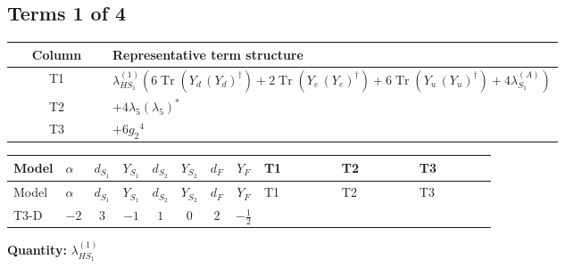 \documentclass[8pt]{article}
\begin{document}
\begin{landscape}
\subsection*{Terms 1 of 4}
\begin{center}
\begin{tabular}{@{}c >{\raggedright\arraybackslash}p{0.82\linewidth}@{}}
\toprule
Column & Representative term structure \\
\midrule
T1 & \(\displaystyle {\lambda_{HS_1}^{(1)}} (6 \operatorname{Tr}\!\left({Y_d}\,\left({Y_d}\right)^{\dagger}\right)+2 \operatorname{Tr}\!\left({Y_e}\,\left({Y_e}\right)^{\dagger}\right)+6 \operatorname{Tr}\!\left({Y_u}\,\left({Y_u}\right)^{\dagger}\right)+4 {\lambda_{S_1}^{(A)}})\) \\
\midrule
T2 & \(\displaystyle +4 {\lambda_5} \left({\lambda_5}\right)^{*}\) \\
\midrule
T3 & \(\displaystyle +6 {g_2}^4\) \\
\midrule
\bottomrule
\end{tabular}
\end{center}
\smallskip
\tiny
\begin{longtable}{@{}llcccccc >{\raggedright\arraybackslash}p{0.21\linewidth} >{\raggedright\arraybackslash}p{0.21\linewidth} >{\raggedright\arraybackslash}p{0.21\linewidth}@{}}
\toprule
Model & $\alpha$ & $d_{S_1}$ & $Y_{S_1}$ & $d_{S_2}$ & $Y_{S_2}$ & $d_F$ & $Y_F$ & T1 & T2 & T3 \\
\midrule
\endfirsthead
\toprule
Model & $\alpha$ & $d_{S_1}$ & $Y_{S_1}$ & $d_{S_2}$ & $Y_{S_2}$ & $d_F$ & $Y_F$ & T1 & T2 & T3 \\
\midrule
\endhead
T3-D & $-2$ & $3$ & $-1$ & $1$ & $0$ & $2$ & $-\frac{1}{2}$ & \scriptsize\adjustbox{max width=\linewidth}{$\begin{gathered} {\lambda_{HS_1}^{(1)}} (6 \operatorname{Tr}\!\left({Y_d}\,\left({Y_d}\right)^{\dagger}\right)+2 \operatorname{Tr}\!\left({Y_e}\,\left({Y_e}\right)^{\dagger}\right)+6 \operatorname{Tr}\!\left({Y_u}\,\left({Y_u}\right)^{\dagger}\right)+4 {\lambda_{S_1}^{(A)}})\end{gathered}$} & \scriptsize\adjustbox{max width=\linewidth}{$\begin{gathered} +4 {\lambda_5} \left({\lambda_5}\right)^{*}\end{gathered}$} & \scriptsize\adjustbox{max width=\linewidth}{$\begin{gathered} +6 {g_2}^4\end{gathered}$} \\
\midrule
\bottomrule
\end{longtable}
\clearpage
\noindent\textbf{Quantity: }$\lambda_{HS_1}^{(1)}$\par\smallskip

\end{landscape}
\end{document}
